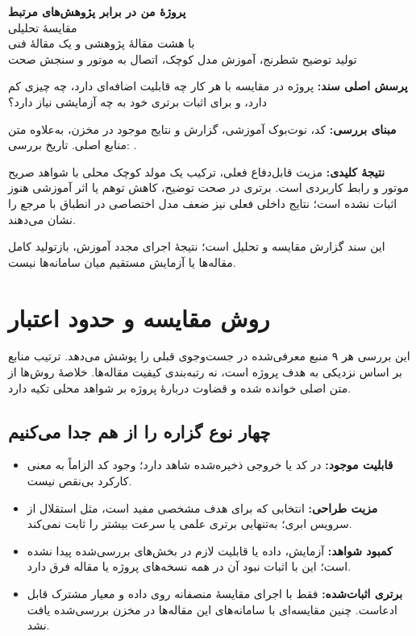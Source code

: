 \documentclass[a4paper,12pt]{article}
\newcommand{\en}[1]{\lr{#1}}
\begin{document}
\begin{titlepage}
\vspace*{2cm}
\begin{center}
{\Huge\bfseries پروژهٔ من در برابر پژوهش‌های مرتبط}\\[1cm]
{\LARGE مقایسهٔ تحلیلی \en{BlunderGuard}}\\[0.5cm]
{\Large با هشت مقالهٔ پژوهشی و یک مقالهٔ فنی}\\[1.5cm]
{\large تولید توضیح شطرنج، آموزش مدل کوچک، اتصال به موتور و سنجش صحت}\\[1.5cm]
\end{center}
\textbf{پرسش اصلی سند:} پروژه در مقایسه با هر کار چه قابلیت اضافه‌ای دارد، چه چیزی کم دارد، و برای اثبات برتری خود به چه آزمایشی نیاز دارد؟

\textbf{مبنای بررسی:} کد، نوت‌بوک آموزشی، گزارش و نتایج موجود در مخزن، به‌علاوه متن منابع اصلی. تاریخ بررسی: \en{2026-09-13}.

\textbf{نتیجهٔ کلیدی:} مزیت قابل‌دفاع فعلی، ترکیب یک مولد کوچک محلی با شواهد صریح موتور و رابط کاربردی است. برتری در صحت توضیح، کاهش توهم یا اثر آموزشی هنوز اثبات نشده است؛ نتایج داخلی فعلی نیز ضعف مدل اختصاصی در انطباق با مرجع را نشان می‌دهند.

\vfill
این سند گزارش مقایسه و تحلیل است؛ نتیجهٔ اجرای مجدد آموزش، بازتولید کامل مقاله‌ها یا آزمایش مستقیم میان سامانه‌ها نیست.
\end{titlepage}
\tableofcontents
\clearpage
\section{روش مقایسه و حدود اعتبار}
این بررسی هر ۹ منبع معرفی‌شده در جست‌وجوی قبلی را پوشش می‌دهد. ترتیب منابع بر اساس نزدیکی به هدف پروژه است، نه رتبه‌بندی کیفیت مقاله‌ها. خلاصهٔ روش‌ها از متن اصلی خوانده شده و قضاوت دربارهٔ پروژه بر شواهد محلی تکیه دارد.

\subsection*{چهار نوع گزاره را از هم جدا می‌کنیم}
\begin{itemize}
\item \textbf{قابلیت موجود:} در کد یا خروجی ذخیره‌شده شاهد دارد؛ وجود کد الزاماً به معنی کارکرد بی‌نقص نیست.
\item \textbf{مزیت طراحی:} انتخابی که برای هدف مشخصی مفید است، مثل استقلال از سرویس ابری؛ به‌تنهایی برتری علمی یا سرعت بیشتر را ثابت نمی‌کند.
\item \textbf{کمبود شواهد:} آزمایش، داده یا قابلیت لازم در بخش‌های بررسی‌شده پیدا نشده است؛ این با اثبات نبود آن در همه نسخه‌های پروژه یا مقاله فرق دارد.
\item \textbf{برتری اثبات‌شده:} فقط با اجرای مقایسهٔ منصفانه روی داده و معیار مشترک قابل ادعاست. چنین مقایسه‌ای با سامانه‌های این مقاله‌ها در مخزن بررسی‌شده یافت نشد.
\end{itemize}
\end{document}
